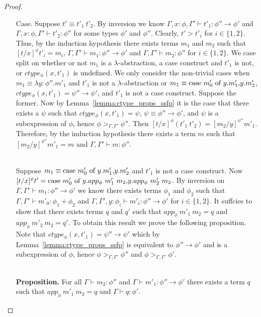 \begin{proof}
\begin{itemize}
\item[Case.] Suppose $t' \equiv t'_1\ t'_2$.  By inversion we know
  $\Gamma, x:\phi, \Gamma' \vdash t'_1 : \phi'' \to \phi'$ and
  $\Gamma, x:\phi, \Gamma' \vdash t'_2 : \phi''$ for some types $\phi'$ and $\phi''$.
  Clearly, $t' > t'_i$ for $i \in \{1,2\}$.  Thus, by the induction hypothesis
  there exists terms $m_1$ and $m_2$ such that $[t/x]^\phi t'_i = m_i$,
  $\Gamma, \Gamma' \vdash m_1 : \phi'' \to \phi'$ and
  $\Gamma, \Gamma' \vdash m_2 : \phi''$ for
  $i \in \{1,2\}$.  We case split on whether or not $m_1$ is a $\lambda$-abstraction,
  a case construct and $t'_1$ is not, or $ctype_\phi(x,t'_1)$ is undefined.  
  We only consider the non-trivial cases when 
  $m_1 \equiv \lambda y:\phi''.m'_1$ and $t'_1$ is not a $\lambda$-abstraction or $m_1 \equiv \mbox{case}\ m'_0\ \text{of}\ y\text{.}m'_1\text{,}y\text{.}m'_2$,
  $ctype_\phi(x,t'_1) = \psi'' \to \psi'$, and $t'_1$ is not a case construct.  Suppose the former.  
  Now by Lemma~\ref{lemma:ctype_props_ssfp} it is the case that 
  there exists a $\psi$ such that $ctype_\phi(x,t'_1) = \psi$, 
  $\psi \equiv \phi'' \to \phi'$, and $\psi$ is a subexpression of $\phi$, hence
  $\phi >_{\Gamma,\Gamma'} \phi''$.
  Then $[t/x]^\phi (t'_1\ t'_2) = [m_2/y]^{\psi''} m'_1$.  
  Therefore, by the induction hypothesis there exists a 
  term $m$ such that $[m_2/y]^{\phi''} m'_1 = m$ and $\Gamma,\Gamma' \vdash m:\phi''$.
  
  \ \\
  Suppose $m_1 \equiv \mbox{case}\ m'_0\ \text{of}\ y\text{.}m'_1\text{,}y\text{.}m'_2$ and $t'_1$ is not a case construct.
  Now $[t/x]^\phi t' = \mbox{case}\ m'_0\ \text{of}\ y\text{.}app_\phi\ m'_1\ m_2\text{,}y\text{.}app_\phi\ m'_2\ m_2$.  By inversion on
  $\Gamma,\Gamma' \vdash m_1 : \phi'' \to \phi'$ we know there exists terms $\phi_1$ and $\phi_2$ such that
  $\Gamma,\Gamma' \vdash m'_0:\phi_1+\phi_2$ and
  $\Gamma,\Gamma',y:\phi_i \vdash m'_i:\phi'' \to \phi'$
  for $i \in \{1,2\}$.  It suffcies to show that
  there exists terms $q$ and $q'$ such that $app_\phi\ m'_1\ m_2 = q$ and $app_\phi\ m'_2\ m_2 = q'$.  To obtain
  this result we prove the following proposition.  Note that $ctype_\phi(x,t'_1) = \psi'' \to \psi'$ which
  by Lemma~\ref{lemma:ctype_props_ssfp} is equivalent to $\phi'' \to \phi'$ and is 
  a subexpression of $\phi$, hence $\phi >_{\Gamma,\Gamma'} \phi''$ and $\phi >_{\Gamma,\Gamma'} \phi'$.

  \ \\
  {\bf Proposition.}  For all 
  $\Gamma \vdash m_2 : \phi''$ and $\Gamma \vdash m'_1:\phi'' \to \phi'$
  there exists a term $q$ such that $app_\phi\ m'_1\ m_2 = q$ and $\Gamma \vdash q:\phi'$.
  

\end{itemize}
\end{proof}
